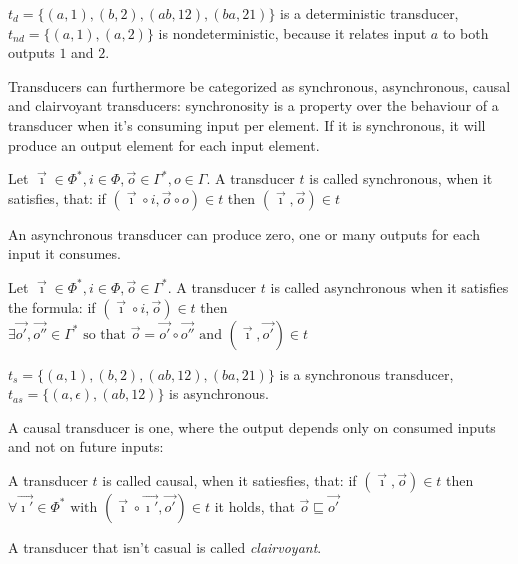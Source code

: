 \begin{exmp}[name = Deterministic and Nondeterministic Transducers]
  \(t_d = \{(a,1),(b,2),(ab,12),(ba,21)\}\) is a deterministic transducer, \(t_{nd} = \{(a,1),(a,2)\}\) is nondeterministic, because it relates input \(a\) to both outputs \(1\) and \(2\).
\end{exmp}

Transducers can furthermore be categorized as synchronous, asynchronous, causal and clairvoyant transducers:
synchronosity is a property over the behaviour of a transducer when it's consuming input per element.
If it is synchronous, it will produce an output element for each input element.

\begin{definition}[name = Synchronous Transducer]\label{def:synchronous_transducer}
Let \(\vec{\imath} \in \Phi^*, i \in \Phi, \vec{o} \in \Gamma^*, o \in \Gamma\).
  A transducer \(t\) is called synchronous, when it satisfies, that:
  if \( (\vec{\imath}\circ i,\vec{o}\circ o) \in t\)
  then \( (\vec{\imath}, \vec{o}) \in t \)
\end{definition}

An asynchronous transducer can produce zero, one or many outputs for each input it consumes.

\begin{definition}[name = Asynchronous Transducer]\label{def:asynchronous_transducer}
  Let \(\vec{\imath}\in \Phi^*, i \in \Phi,\vec{o} \in \Gamma^*\).
  A transducer \(t\) is called asynchronous when it satisfies the formula:
  if \((\vec{\imath}\circ i, \vec{o}) \in t \)
  then \(\exists \vec{o'},\vec{o''} \in \Gamma^*\text{ so that } \vec{o} = \vec{o'}\circ\vec{o''} \text{ and } (\vec{\imath},\vec{o'}) \in t \)
\end{definition}

\begin{exmp}[name = Synchronous and Asynchronous Transducers]
  \(t_s = \{(a,1),(b,2),(ab,12),(ba,21)\}\) is a synchronous transducer, \(t_{as} = \{(a,\epsilon),(ab,12)\}\) is asynchronous.
\end{exmp}

A causal transducer is one, where the output depends only on consumed inputs and not on future inputs:

\begin{definition}[name = Causal and Clairvoyant Transducers]\label{def:causal_transducer}
  A transducer \(t\) is called causal, when it satiesfies, that:
  if \((\vec{\imath},\vec{o}) \in t \)
  then \( \forall \vec{\imath'} \in \Phi^* \text{ with } (\vec{\imath} \circ \vec{\imath'}, \vec{o'}) \in t \)
  it holds, that \( \vec{o} \sqsubseteq \vec{o'} \)

  A transducer that isn't casual is called \emph{clairvoyant}.
\end{definition}



